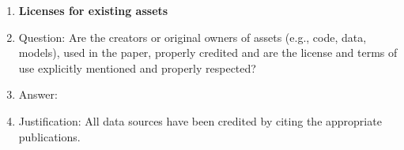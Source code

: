 \begin{enumerate}
\item {\bf Licenses for existing assets}
    \item[] Question: Are the creators or original owners of assets (e.g., code, data, models), used in the paper, properly credited and are the license and terms of use explicitly mentioned and properly respected?
    \item[] Answer: \answerYes{} %
    \item[] Justification: All data sources have been credited by citing the appropriate publications. 


\end{enumerate}

